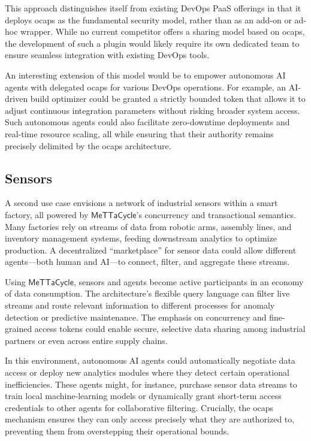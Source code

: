 \documentclass{article}
\newcommand{\MC}{\mathsf{MeTTaCycle}}
\begin{document}
This approach distinguishes itself from existing DevOps PaaS offerings
in that it deploys ocaps as the fundamental security model, rather
than as an add-on or ad-hoc wrapper. While no current competitor
offers a sharing model based on ocaps, the development of such a
plugin would likely require its own dedicated team to ensure seamless
integration with existing DevOps tools.

An interesting extension of this model would be to empower autonomous
AI agents with delegated ocaps for various DevOps operations. For
example, an AI-driven build optimizer could be granted a strictly
bounded token that allows it to adjust continuous integration
parameters without risking broader system access. Such autonomous
agents could also facilitate zero-downtime deployments and real-time
resource scaling, all while ensuring that their authority remains
precisely delimited by the ocaps architecture.

\subsection{Sensors}

A second use case envisions a network of industrial sensors within a
smart factory, all powered by $\MC$'s concurrency and transactional
semantics. Many factories rely on streams of data from robotic arms,
assembly lines, and inventory management systems, feeding downstream
analytics to optimize production. A decentralized “marketplace” for
sensor data could allow different agents---both human and AI---to
connect, filter, and aggregate these streams.

Using $\MC$, sensors and agents become active participants in an
economy of data consumption. The architecture’s flexible query
language can filter live streams and route relevant information to
different processes for anomaly detection or predictive
maintenance. The emphasis on concurrency and fine-grained access
tokens could enable secure, selective data sharing among industrial
partners or even across entire supply chains.

In this environment, autonomous AI agents could automatically
negotiate data access or deploy new analytics modules where they
detect certain operational inefficiencies. These agents might, for
instance, purchase sensor data streams to train local machine-learning
models or dynamically grant short-term access credentials to other
agents for collaborative filtering. Crucially, the ocaps mechanism
ensures they can only access precisely what they are authorized to,
preventing them from overstepping their operational bounds.
\end{document}
